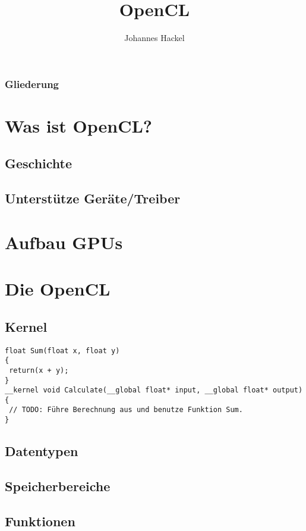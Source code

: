 \documentclass{beamer}
\author{Johannes Hackel}
\title{OpenCL}
\begin{document}
\begin{frame}
\titlepage
\end{frame}

\begin{frame}
\frametitle{Gliederung}
\tableofcontents
\end{frame}

\section{Was ist OpenCL?}
\subsection{Geschichte}
\subsection{Unterstütze Geräte/Treiber}

\section{Aufbau GPUs}

\section{Die OpenCL}
\subsection{Kernel}
\begin{frame}
\begin{lstlisting}
float Sum(float x, float y)
{
 return(x + y);
}
__kernel void Calculate(__global float* input, __global float* output)
{
 // TODO: Führe Berechnung aus und benutze Funktion Sum.
}

\end{lstlisting}

\end{frame}
\subsection{Datentypen}
\subsection{Speicherbereiche}
\subsection{Funktionen}
\end{document}
